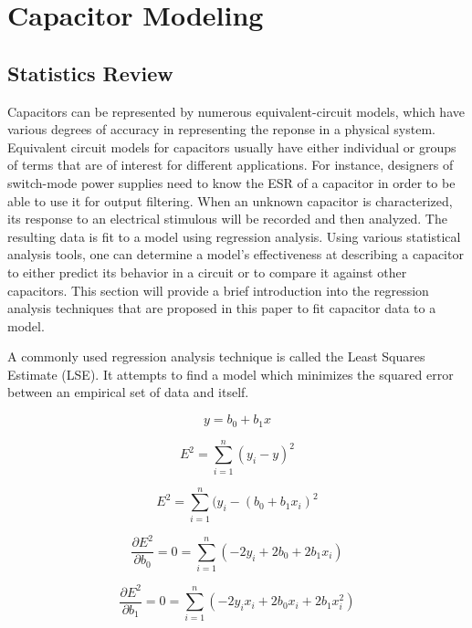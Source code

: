 \section {Capacitor Modeling}
\subsection{Statistics Review}
Capacitors can be represented by numerous equivalent-circuit models, which have various degrees of accuracy in representing the reponse in a physical system. Equivalent circuit models for capacitors usually have either individual or groups of terms that are  of interest for different applications. For instance, designers of switch-mode power supplies need to know the ESR of a capacitor in order to be able to use it for output filtering. When an unknown capacitor is characterized, its response to an electrical stimulous will be recorded and then analyzed. The resulting data is fit to a model using regression analysis. Using various statistical analysis tools, one can determine a model's effectiveness at describing a capacitor to either predict its behavior in a circuit or to compare it against other capacitors. This section will provide a brief introduction into the regression analysis techniques that are proposed in this paper to fit capacitor data to a model.

A commonly used regression analysis technique is called the Least Squares Estimate (LSE). It attempts to find a model which minimizes the squared error between an empirical set of data and itself.

\begin{equation}
y = b_0 + b_1 x
\end{equation}

\begin{equation}
E^2 = \sum_{i=1}^{n} (y_i - y)^2
\end{equation}

\begin{equation}
E^2 = \sum_{i=1}^{n} (y_i - (b_0 + b_1 x_i)^2
\end{equation}

\begin{equation}
\frac{\partial E^2}{\partial b_0} = 0 = \sum_{i=1}^{n} (-2y_i +2b_0 + 2b_1 x_i)
\end{equation}

\begin{equation}
\frac{\partial E^2}{\partial b_1} = 0 = \sum_{i=1}^{n} (-2y_i x_i +2b_0 x_i + 2b_1 x_i^2)
\end{equation}

